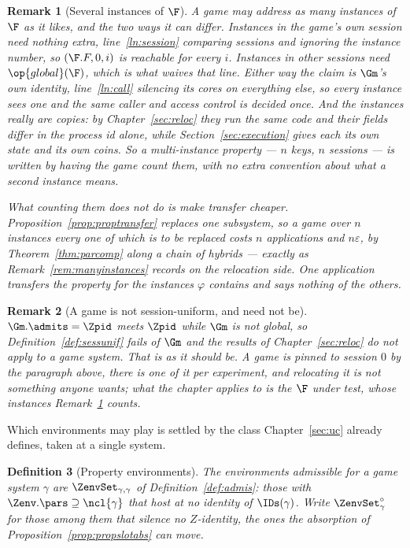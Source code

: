 \documentclass[10pt,oneside,openany]{book}
\theoremstyle{accentdef}
\newtheorem{definition}{Definition}[chapter]
\newtheorem{remark}[definition]{Remark}
\theoremstyle{accentplain}
\begin{document}
\begin{remark}[Several instances of $\F$]\label{rem:gminstances}
A game may address as many instances of $\F$ as it likes, and the two ways it can differ.
Instances in the game's own session need nothing extra, line~\ref{ln:session} comparing sessions and
ignoring the instance number, so $(\F.F,0,i)$ is reachable for every $i$. Instances in other sessions
need $\op{global}(\F)$, which is what waives that line. Either way the claim is $\Gm$'s own identity,
line~\ref{ln:call} silencing its cores on everything else, so every instance sees one and the same
caller and access control is decided once. And the instances really are copies: by
Chapter~\ref{sec:reloc} they run the same code and their fields differ in the process id alone, while
Section~\ref{sec:execution} gives each its own state and its own coins. So a multi-instance property
--- $n$ keys, $n$ sessions --- is written by having the game count them, with no extra convention
about what a second instance means.

What counting them does not do is make transfer cheaper. Proposition~\ref{prop:proptransfer} replaces
one subsystem, so a game over $n$ instances every one of which is to be replaced costs $n$
applications and $n\varepsilon$, by Theorem~\ref{thm:parcomp} along a chain of hybrids --- exactly as
Remark~\ref{rem:manyinstances} records on the relocation side. One application transfers the property
for the instances $\varphi$ contains and says nothing of the others.
\end{remark}

\begin{remark}[A game is not session-uniform, and need not be]\label{rem:gmsessunif}
$\Gm.\admits = \Zpid$ meets $\Zpid$ while $\Gm$ is not global, so Definition~\ref{def:sessunif} fails
of $\Gm$ and the results of Chapter~\ref{sec:reloc} do not apply to a game system. That is as it
should be. A game is pinned to session $0$ by the paragraph above, there is one of it per experiment,
and relocating it is not something anyone wants; what the chapter applies to is the $\F$ under test,
whose instances Remark~\ref{rem:gminstances} counts.
\end{remark}

Which environments may play is settled by the class Chapter~\ref{sec:uc} already defines, taken at a
single system.

\begin{definition}[Property environments]\label{def:propenv}
The environments \emph{admissible for} a game system $\gamma$ are $\ZenvSet_{\gamma,\gamma}$ of
Definition~\ref{def:admis}: those with $\Zenv.\pars \supseteq \ncl{\gamma}$ that host at no identity
of $\IDs(\gamma)$. Write $\ZenvSet^{\circ}_{\gamma}$ for those among them that silence no $Z$-identity,
the ones the absorption of Proposition~\ref{prop:propslotabs} can move.
\end{definition}
\end{document}
